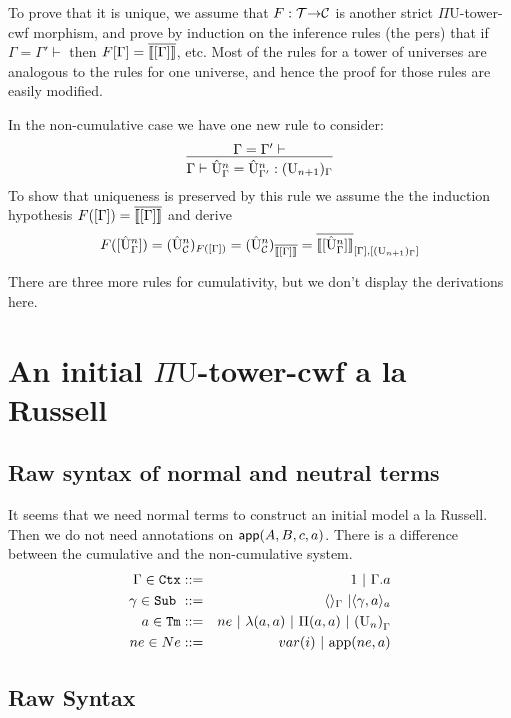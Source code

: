 \documentclass{lmcs}
\def\UU{\mathrm{U}}
\def\UUhat{\hat{\UU}}
\begin{document}
To prove that it is unique, we assume that $F : {\mathcal T} {\rightarrow} {\mathcal C}$ is another strict $\Pi\UU$-tower-cwf
morphism, and prove by induction on the inference rules (the pers) that if $\Gamma = \Gamma' \vdash$
then $F[\Gamma] = \overline{\llbracket [\Gamma] \rrbracket}$, etc.  Most of the rules for a tower of universes are analogous to the rules for one universe, and hence the proof for those rules are easily modified.

In the non-cumulative case we have one new rule to consider:
$$
\infer{\Gamma \vdash \UUhat^n_\Gamma =  \UUhat^n_{\Gamma'}: (\UU_{n+1})_\Gamma}{\Gamma = \Gamma' \vdash}
$$
To show that uniqueness is preserved by this rule we assume the the induction hypothesis $F([\Gamma]) = \overline{\llbracket [\Gamma] \rrbracket}$ and derive 
$$
F([\UUhat^n_\Gamma]) = (\UUhat^n_\C)_{F([\Gamma])} = (\UUhat^n_\C)_{\iniCtx{[\Gamma]}} 
= \iniTm{[\Gamma]}{[(\UU_{n+1})_\Gamma]}{[\UUhat^n_\Gamma]}
$$

There are three more rules for cumulativity, but we don't display the derivations here.

\newpage
\section{An initial $\Pi\UU$-tower-cwf a la Russell}

\subsection{Raw syntax of normal and neutral terms}

It seems that we need normal terms to construct an initial model a la Russell. Then we do not need annotations on $\mathsf{app}(A,B,c,a)$. There is a difference between the cumulative and the non-cumulative system.
\begin{eqnarray*}
\Gamma \in \RawCtx &::=& 1  \ |\ \Gamma.a\\
\gamma \in \RawSub \ &::=& \langle\rangle_\Gamma \ | \langle \gamma, a \rangle_a\\
a \in \RawTm &::=& ne  \ |\ \lambda(a,a) \ |\ \Pi(a,a)  \ |\  {(\UU_n)}_\Gamma\\
ne \in Ne &::=& var(i)   \ |\ \ap(ne,a) 
\end{eqnarray*}


\subsection{Raw Syntax}
\end{document}
